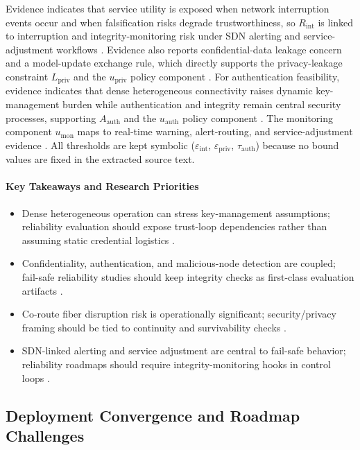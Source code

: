 \documentclass[lettersize,journal]{IEEEtran}
\begin{document}
Evidence indicates that service utility is exposed when network interruption events occur and when falsification risks degrade trustworthiness, so $R_{\mathrm{int}}$ is linked to interruption and integrity-monitoring risk under SDN alerting and service-adjustment workflows \cite{O_ISAC_041, O_ISAC_145}. Evidence also reports confidential-data leakage concern and a model-update exchange rule, which directly supports the privacy-leakage constraint $L_{\mathrm{priv}}$ and the $u_{\mathrm{priv}}$ policy component \cite{O_ISAC_039}. For authentication feasibility, evidence indicates that dense heterogeneous connectivity raises dynamic key-management burden while authentication and integrity remain central security processes, supporting $A_{\mathrm{auth}}$ and the $u_{\mathrm{auth}}$ policy component \cite{O_ISAC_156}. The monitoring component $u_{\mathrm{mon}}$ maps to real-time warning, alert-routing, and service-adjustment evidence \cite{O_ISAC_041}. All thresholds are kept symbolic ($\varepsilon_{\mathrm{int}}$, $\varepsilon_{\mathrm{priv}}$, $\tau_{\mathrm{auth}}$) because no bound values are fixed in the extracted source text.

\paragraph{Key Takeaways and Research Priorities}
\begin{itemize}
    \item Dense heterogeneous operation can stress key-management assumptions; reliability evaluation should expose trust-loop dependencies rather than assuming static credential logistics \cite{O_ISAC_156}.
    \item Confidentiality, authentication, and malicious-node detection are coupled; fail-safe reliability studies should keep integrity checks as first-class evaluation artifacts \cite{O_ISAC_156}.
    \item Co-route fiber disruption risk is operationally significant; security/privacy framing should be tied to continuity and survivability checks \cite{O_ISAC_041}.
    \item SDN-linked alerting and service adjustment are central to fail-safe behavior; reliability roadmaps should require integrity-monitoring hooks in control loops \cite{O_ISAC_041}.
\end{itemize}

\subsection{Deployment Convergence and Roadmap Challenges}
\end{document}
